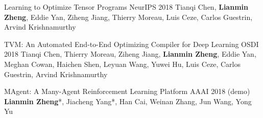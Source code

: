 \begin{cventries}
\cventry
{}
{Learning to Optimize Tensor Programs} %
{NeurIPS 2018} %
{} %
{Tianqi Chen, \textbf{Lianmin Zheng}, Eddie Yan, Ziheng Jiang, Thierry Moreau, Luis Ceze, Carlos Guestrin, Arvind Krishnamurthy}

\cventry
{}
{TVM: An Automated End-to-End Optimizing Compiler for Deep Learning} %
{OSDI 2018} %
{} %
{Tianqi Chen, Thierry Moreau, Ziheng Jiang, \textbf{Lianmin Zheng}, Eddie Yan, Meghan Cowan, Haichen Shen, Leyuan Wang, Yuwei Hu, Luis Ceze, Carlos Guestrin, Arvind Krishnamurthy}

\cventry
{}
{MAgent: A Many-Agent Reinforcement Learning Platform} %
{AAAI 2018 (demo)} %
{} %
{\textbf{Lianmin Zheng}*, Jiacheng Yang*, Han Cai, Weinan Zhang, Jun Wang, Yong Yu}

\end{cventries}